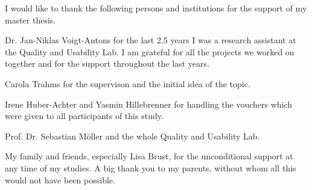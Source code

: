 \thispagestyle{empty}
\vspace*{3cm}

I would like to thank the following persons and institutions for the support of my master thesis.

Dr. Jan-Niklas Voigt-Antons for the last 2.5 years I was a research assistant at the Quality and Usability Lab. I am grateful for all the projects we worked on together and for the support throughout the last years.

Carola Trahms for the supervison and the initial idea of the topic.

Irene Huber-Achter and Yasmin Hillebrenner for handling the vouchers which were given to all participants of this study.

Prof. Dr. Sebastian M\"oller and the whole Quality and Usability Lab.

My family and friends, especially Lisa Brust, for the unconditional support at any time of my studies. A big thank you to my parents, without whom all this would not have been possible.

